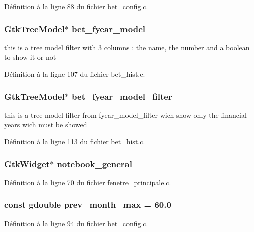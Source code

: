 Définition à la ligne 88 du fichier bet\_\-config.c.

\subsubsection[{bet\_\-fyear\_\-model}]{\setlength{\rightskip}{0pt plus 5cm}GtkTreeModel$\ast$ {\bf bet\_\-fyear\_\-model}}\label{bet__config_8c_a3b7bcf1e9b05e7a812d6f4d4bc0627d6}
this is a tree model filter with 3 columns : the name, the number and a boolean to show it or not 

Définition à la ligne 107 du fichier bet\_\-hist.c.

\subsubsection[{bet\_\-fyear\_\-model\_\-filter}]{\setlength{\rightskip}{0pt plus 5cm}GtkTreeModel$\ast$ {\bf bet\_\-fyear\_\-model\_\-filter}}\label{bet__config_8c_aecc63d6768ce86bba48badbe50334f1b}
this is a tree model filter from fyear\_\-model\_\-filter wich show only the financial years wich must be showed 

Définition à la ligne 113 du fichier bet\_\-hist.c.

\subsubsection[{notebook\_\-general}]{\setlength{\rightskip}{0pt plus 5cm}GtkWidget$\ast$ {\bf notebook\_\-general}}\label{bet__config_8c_a8924516aa4170f932308e93cf93a785b}


Définition à la ligne 70 du fichier fenetre\_\-principale.c.

\subsubsection[{prev\_\-month\_\-max}]{\setlength{\rightskip}{0pt plus 5cm}const gdouble {\bf prev\_\-month\_\-max} = 60.0}\label{bet__config_8c_a2a9036317d63fb6459987ed41b88bf4f}


Définition à la ligne 94 du fichier bet\_\-config.c.

